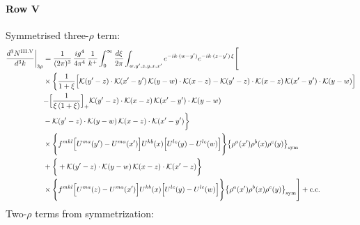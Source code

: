 \documentclass[9pt]{article}
\numberwithin{equation}{section}
\begin{document}
\paragraph*{Row V}
Symmetrised three-$\rho$ term:
\begin{align}
\frac{d^{3}N^{\rm III.V}}{d^{3}k}\bigg|_{3\rho}&=\frac{1}{(2\pi)^{3}}\,\frac{ig^{4}}{4\pi^{4}}\,\frac{1}{k^{+}}\int_{0}^{\infty}\frac{d\xi}{2\pi}\int_{w,y',z,y,x,x'}e^{-ik\cdot(w-y')}e^{-ik\cdot(z-y')\,\xi}\Bigg[\notag\\
&\times\bigg\{\frac{1}{1+\xi}\Big[\mathcal{K}(y'-z)\cdot\mathcal{K}(x'-y')\,\mathcal{K}(y-w)\cdot\mathcal{K}(x-z)-\mathcal{K}(y'-z)\cdot\mathcal{K}(x-z)\,\mathcal{K}(x'-y')\cdot\mathcal{K}(y-w)\Big]\notag\\
&{-\Big[\frac{1}{\xi\,(1+\xi)}\Big]_{+}\mathcal{K}(y'-z)\cdot\mathcal{K}(x-z)\,\mathcal{K}(x'-y')\cdot\mathcal{K}(y-w)}\notag\\
&-\mathcal{K}(y'-z)\cdot\mathcal{K}(y-w)\,\mathcal{K}(x-z)\cdot\mathcal{K}(x'-y')\bigg\}\notag\\
&\times \Bigg\{f^{mkl}\Big[U^{ma}(y')-U^{ma}(x')\Big]U^{kb}(x)\Big[U^{lc}(y)-U^{lc}(w)\Big]\Bigg\}\big\{\rho^{a}(x')\rho^{b}(x)\rho^{c}(y)\big\}_{\rm sym}\notag\\
&+\bigg\{+\mathcal{K}(y'-z)\cdot\mathcal{K}(y-w)\,\mathcal{K}(x-z)\cdot\mathcal{K}(x'-z)\bigg\}\notag\\
&\times \Bigg\{f^{mkl}\Big[U^{ma}(z)-U^{ma}(x')\Big]U^{kb}(x)\Big[U^{lc}(y)-U^{lc}(w)\Big]\Bigg\}\big\{\rho^{a}(x')\rho^{b}(x)\rho^{c}(y)\big\}_{\rm sym}\Bigg]+{\rm c.c.}\label{eq:H-III.V-3}
\end{align}
Two-$\rho$ terms from symmetrization: 
\end{document}
